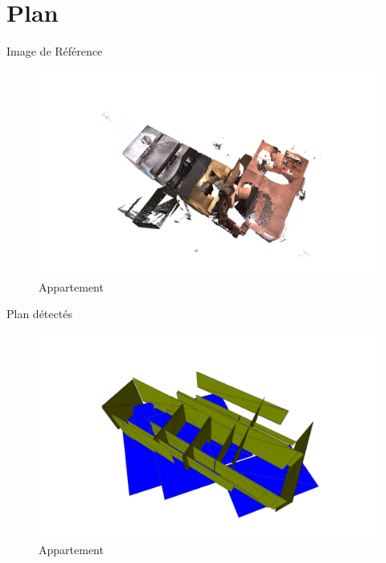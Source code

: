 \documentclass[11pt]{beamer}
\begin{document}
\section{Plan}



\begin{frame}{Image de Référence}
\begin{figure}[hbtp]
\centering
\includegraphics[width=\columnwidth]{appart01.png}
\caption{Appartement}
\end{figure}
\end{frame}

\begin{frame}{Plan détectés}
\begin{figure}[hbtp]
\centering
\includegraphics[width=\columnwidth]{appart04.png}
\caption{Appartement}
\end{figure}
\end{frame}
\end{document}
